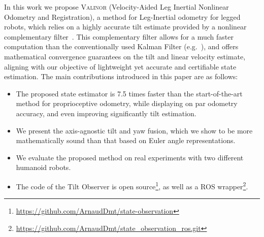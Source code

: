 \documentclass{IJCAS}
\begin{document}
In this work we propose {\scshape Valinor} (Velocity-Aided Leg Inertial Nonlinear Odometry and Registration), a method for Leg-Inertial odometry for legged robots, which relies on a highly accurate tilt estimate provided by a nonlinear complementary filter~\cite{benallegue2020LyapunovStableOrientationEstimatorHumanoids}. This complementary filter allows for a much faster computation than the conventionally used Kalman Filter (e.g.~\cite{Hartley2020RIEKF}), and offers mathematical convergence guarantees on the tilt and linear velocity estimate, aligning with our objective of lightweight yet accurate and certifiable state estimation.
The main contributions introduced in this paper are as follows:
\begin{itemize}
  \item The proposed state estimator is 7.5 times faster than the start-of-the-art method for proprioceptive odometry, while displaying on par odometry accuracy, and even improving significantly tilt estimation.
  \item We present the axis-agnostic tilt and yaw fusion, which we show to be more mathematically sound than that based on Euler angle representations.
  \item We evaluate the proposed method on real experiments with two different humanoid robots.
  \item The code of the Tilt Observer is open source\footnote{\scriptsize \url{https://github.com/ArnaudDmt/state-observation}}, as well as a ROS wrapper\footnote{\scriptsize \url{https://github.com/ArnaudDmt/state_observation_ros.git}}.
\end{itemize}

\end{document}
